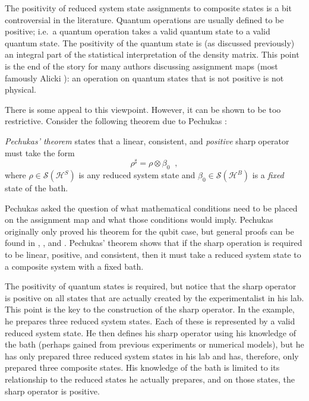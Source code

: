 The positivity of reduced system state assignments to composite states is a bit controversial in the literature.  Quantum operations are usually defined to be positive; i.e.\ a quantum operation takes a valid quantum state to a valid quantum state.  The positivity of the quantum state is (as discussed previously) an integral part of the statistical interpretation of the density matrix.  This point is the end of the story for many authors discussing assignment maps (most famously Alicki \cite{Alicki1995}): an operation on quantum states that is not positive is not physical.  

There is some appeal to this viewpoint.  However, it can be shown to be too restrictive.  Consider the following theorem due to Pechukas \cite{Pechukas1994}:
\begin{theorem}
{\em Pechukas' theorem} states that a linear, consistent, and {\em positive} sharp operator must take the form
$$
\rho^\sharp = \rho \otimes \beta_0\;\;,
$$
where $\rho\in\mathcal{S}(\mathcal{H}^S)$ is any reduced system state and $\beta_0\in\mathcal{S}(\mathcal{H}^B)$ is a {\em fixed} state of the bath.
\end{theorem}

Pechukas asked the question of what mathematical conditions need to be placed on the assignment map and what those conditions would imply.  Pechukas originally only proved his theorem for the qubit case, but general proofs can be found in \cite{Jordan2004}, \cite{Rodriguez2010}, and \cite{Masillo2011}.  Pechukas' theorem shows that if the sharp operation is required to be linear, positive, and consistent, then it must take a reduced system state to a composite system with a fixed bath.  

The positivity of quantum states is required, but notice that the sharp operator is positive on all states that are actually created by the experimentalist in his lab.  This point is the key to the construction of the sharp operator.  In the example, he prepares three reduced system states.  Each of these is represented by a valid reduced system state.  He then defines his sharp operator using his knowledge of the bath (perhaps gained from previous experiments or numerical models), but he has only prepared three reduced system states in his lab and has, therefore, only prepared three composite states.  His knowledge of the bath is limited to its relationship to the reduced states he actually prepares, and on those states, the sharp operator is positive.   

